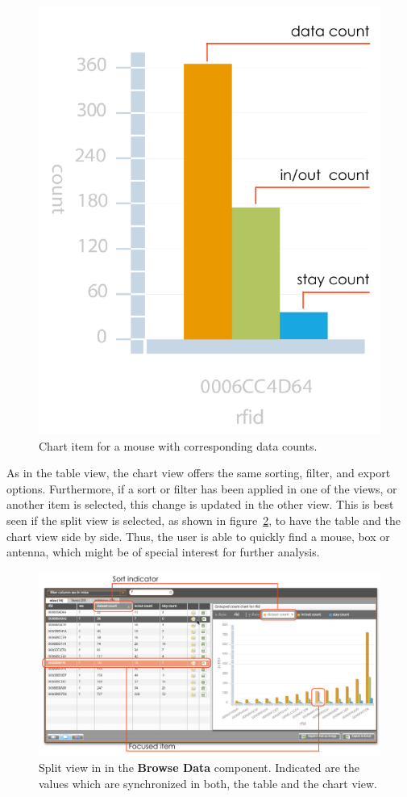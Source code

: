 \begin{figure}[!htbp]
\begin{center}
  \includegraphics[width=.33\textwidth]{assets/pdf/mouse_chart_item.pdf}
  \caption[Chart item for a mouse with corresponding data counts]{Chart item for a mouse with corresponding data counts.}
  \label{fig:mouse_chart_item}
\end{center}
\end{figure}

As in the table view, the chart view offers the same sorting, filter, and export options. Furthermore, if a sort or filter has been applied in one of the views, or another item is selected, this change is updated in the other view. This is best seen if the split view is selected, as shown in figure~\ref{fig:table_chart_view}, to have the table and the chart view side by side. Thus, the user is able to quickly find a mouse, box or antenna, which might be of special interest for further analysis.

\begin{figure}[htpb]
\begin{center}
  \includegraphics[width=\textwidth]{assets/pdf/table_chart_view.pdf}
  \caption[Split view]{Split view in in the \textbf{Browse Data} component. Indicated are the values which are synchronized in both, the table and the chart view.}
  \label{fig:table_chart_view}
\end{center}
\end{figure}


